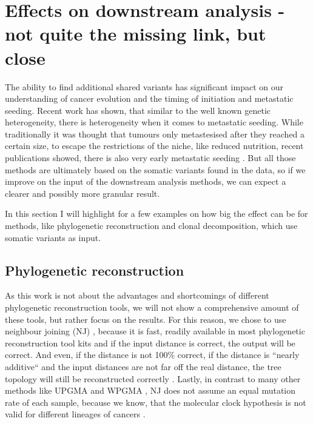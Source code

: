 \section[Effects on downstream analysis]{Effects on downstream analysis - not quite the missing link, but close}
\label{variantcalling-sec:downstream}

The ability to find additional shared variants has significant impact on our understanding of cancer evolution and the timing of initiation and metastatic seeding. Recent work has shown, that similar to the well known genetic heterogeneity, there is heterogeneity when it comes to metastatic seeding. While traditionally it was thought that tumours only metastesised after they reached a certain size, to escape the restrictions of the niche, like reduced nutrition, recent publications showed, there is also very early metastatic seeding \cite{Hu2019}. 
But all those methods are ultimately based on the somatic variants found in the data, so if we improve on the input of the downstream analysis methods, we can expect a clearer and possibly more granular result.

In this section I will highlight for a few examples on how big the effect can be for methods, like phylogenetic reconstruction and clonal decomposition, which use somatic variants as input.


\subsection[Phylogenetic reconstruction]{Phylogenetic reconstruction}
\label{variantcalling-sec:phylo}
As this work is not about the advantages and shortcomings of different phylogenetic reconstruction tools, we will not show a comprehensive amount of these tools, but rather focus on the results.  For this reason, we chose to use neighbour joining (NJ) \cite{Saitou1987}, because it is fast, readily available in most phylogenetic reconstruction tool kits and if the input distance is correct, the output will be correct. And even, if the distance is not 100\% correct, if the distance is ``nearly additive`` and the input distances are not far off the real distance, the tree topology will still be reconstructed correctly \cite{Mihaescu2007}. Lastly, in contrast to many other methods like UPGMA and WPGMA \cite{Sokal1958}, NJ does not assume an equal mutation rate of each sample, because we know, that the molecular clock hypothesis \cite{Zuckerkandl1962} is not valid for different lineages of cancers \cite{Shibata2010}.

